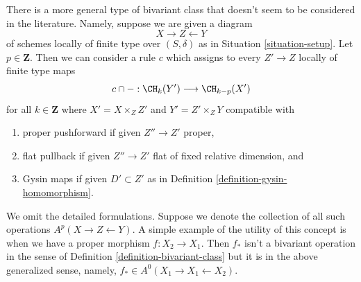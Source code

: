 \begin{remark}
\label{remark-more-general-bivariant}
There is a more general type of bivariant class that doesn't seem to be
considered in the literature. Namely, suppose we are given a diagram
$$
X \longrightarrow Z \longleftarrow Y
$$
of schemes locally of finite type over $(S, \delta)$ as in
Situation \ref{situation-setup}. Let $p \in \mathbf{Z}$.
Then we can consider a rule $c$ which assigns to every $Z' \to Z$
locally of finite type maps
$$
c \cap - : \CH_k(Y') \longrightarrow \CH_{k - p}(X')
$$
for all $k \in \mathbf{Z}$
where $X' = X \times_Z Z'$ and $Y' = Z' \times_Z Y$ compatible with
\begin{enumerate}
\item proper pushforward if given $Z'' \to Z'$ proper,
\item flat pullback if given $Z'' \to Z'$ flat
of fixed relative dimension, and
\item Gysin maps if given $D' \subset Z'$ as in
Definition \ref{definition-gysin-homomorphism}.
\end{enumerate}
We omit the detailed formulations. Suppose we denote the collection
of all such operations $A^p(X \to Z \leftarrow Y)$. A simple example
of the utility of this concept is when we have a proper morphism
$f : X_2 \to X_1$. Then $f_*$ isn't a bivariant operation in the sense of
Definition \ref{definition-bivariant-class} but it is in the
above generalized sense, namely, $f_* \in A^0(X_1 \to X_1 \leftarrow X_2)$.
\end{remark}





